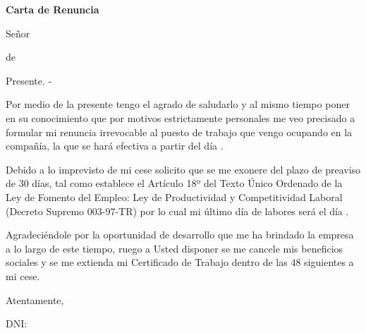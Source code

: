 \documentclass{letter}
\newcommand\receiverBegin[0]{Señor}
\newcommand\receiverBegin[0]{Señora}
\newcommand\exonerationMessage[0]{
  Debido a lo imprevisto de mi cese solicito que se me exonere del plazo de preaviso de 30 días, tal como establece el Artículo 18º del Texto Único Ordenado de la Ley de Fomento del Empleo: Ley de Productividad y Competitividad Laboral (Decreto Supremo 003-97-TR) por lo cual mi último día de labores será el día \resignationStartDate.}
\newcommand\exonerationMessage[0]{}
\begin{document}
\thispagestyle{empty}

\begin{center}
\textbf{Carta de Renuncia}
\bigskip\noindent
\end{center}

\begin{flushright}
\cityDate
\end{flushright}

\begin{flushleft}

\receiverBegin \xspace \receiverName

\jobTitle \xspace de \businessName

Presente. -

Por medio de la presente tengo el agrado de saludarlo y al mismo tiempo poner en su conocimiento que por motivos estrictamente personales me veo precisado a formular mi renuncia irrevocable al puesto de trabajo que vengo ocupando en la compañía, la que se hará efectiva a partir del día \resignationStartDate.

\exonerationMessage

Agradeciéndole por la oportunidad de desarrollo que me ha brindado la empresa a lo largo de este tiempo, ruego a Usted disponer se me cancele mis beneficios sociales y se me extienda mi Certificado de Trabajo dentro de las 48 siguientes a mi cese.

Atentamente,

\begin{flushright}
\underline{\hspace{4cm}}

DNI: \docNumber

\fullName

\end{flushright}

\end{flushleft}
\end{document}

